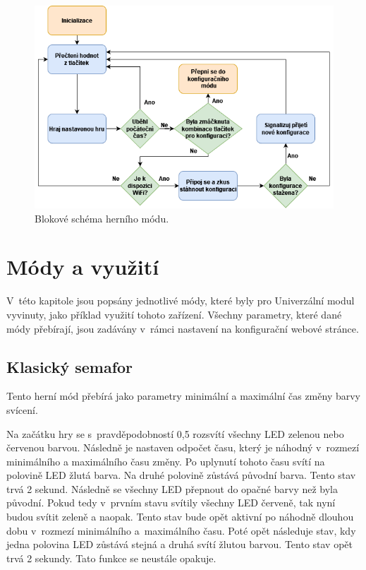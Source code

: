 \begin{figure}[!h]
  \begin{center}
    \includegraphics[scale=0.65]{obrazky/blokove_schema_modu_PLAY.png}
  \end{center}
  \caption[Blokové schéma herního módu]{Blokové schéma herního módu.}
\end{figure}

\chapter{Módy a využití}
V~této kapitole jsou popsány jednotlivé módy, které byly pro Univerzální modul vyvinuty, jako příklad využití tohoto zařízení. Všechny parametry, které dané módy přebírají, jsou zadávány 
v~rámci nastavení na konfigurační webové stránce.

\section{Klasický semafor}
Tento herní mód přebírá jako parametry minimální a maximální čas změny barvy svícení. 

Na začátku hry se s~pravděpodobností 0,5 rozsvítí všechny LED zelenou nebo červenou barvou. Následně je nastaven odpočet času, který je náhodný v~rozmezí minimálního a maximálního času změny. 
Po uplynutí tohoto času svítí na polovině LED žlutá barva. Na druhé polovině zůstává původní barva. Tento stav trvá 2 sekund. Následně se všechny LED přepnout do opačné barvy než byla původní. 
Pokud tedy v~prvním stavu svítily všechny LED červeně, tak nyní budou svítit zeleně a naopak. Tento stav bude opět aktivní po náhodně dlouhou dobu v~rozmezí minimálního a~maximálního času. Poté 
opět následuje stav, kdy jedna polovina LED zůstává stejná a druhá svítí žlutou barvou. Tento stav opět trvá 2 sekundy. Tato funkce se neustále opakuje. 


